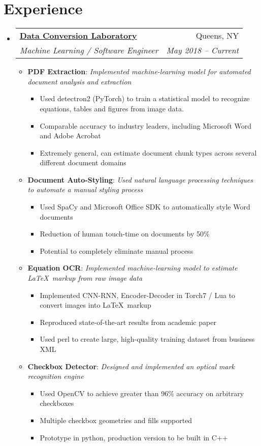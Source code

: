 \documentclass{article}
\makeatletter
\newcommand{\TwoRowSubheading}[4]{
	\item
		\begin{tabular*}{.95\textwidth}{l @{\extracolsep{\fill}} r}
			\textbf{#1} & #2 \\
			\textit{\small #3} & \textit{\small #4} \\
		\end{tabular*} \vspace{-0.5em}
}
\newcommand{\ListItem}[2]{
	\item \small \textbf{#1}{: \it #2}
}
\makeatother
\begin{document}
\section{Experience}
\begin{itemize}[label=\faUsers]    

	\TwoRowSubheading
		{\href{http://www.dclab.com}{Data Conversion Laboratory}}{Queens, NY}
		{Machine Learning / Software Engineer}{May 2018 -- Current}
	
	\begin{itemize}[label=\faGears] 

		\ListItem{PDF Extraction}{Implemented machine-learning model for automated document analysis and extraction}
		\begin{itemize}[label=\faGear]
			\item Used detectron2 (PyTorch) to train a statistical model to recognize equations, tables and figures from image data.
			\item Comparable accuracy to industry leaders, including Microsoft Word and Adobe Acrobat
			\item Extremely general, can estimate document chunk types across several different document domains
		\end{itemize}

		\ListItem{Document Auto-Styling}{Used natural language processing techniques to automate a manual styling process}
		\begin{itemize}[label=\faGear]
			\item Used SpaCy and Microsoft Office SDK to automatically style Word documents
			\item Reduction of human touch-time on documents by 50\%
			\item Potential to completely eliminate manual process 
		\end{itemize}

		\ListItem{Equation OCR}{Implemented machine-learning model to estimate \LaTeX\ markup from raw image data}
		\begin{itemize}[label=\faGear]
			\item Implemented CNN-RNN, Encoder-Decoder in Torch7 / Lua to convert images into \LaTeX\ markup
			\item Reproduced state-of-the-art results from academic paper
			\item Used perl to create large, high-quality training dataset from business XML
		\end{itemize}
	
		\ListItem{Checkbox Detector}{Designed and implemented an optical mark recognition engine}
		\begin{itemize}[label=\faGear]
			\item Used OpenCV to achieve greater than 96\% accuracy on arbitrary checkboxes
			\item Multiple checkbox geometries and fills supported
			\item Prototype in python, production version to be built in C++
		\end{itemize}


\end{itemize}
\end{itemize}
\end{document}
